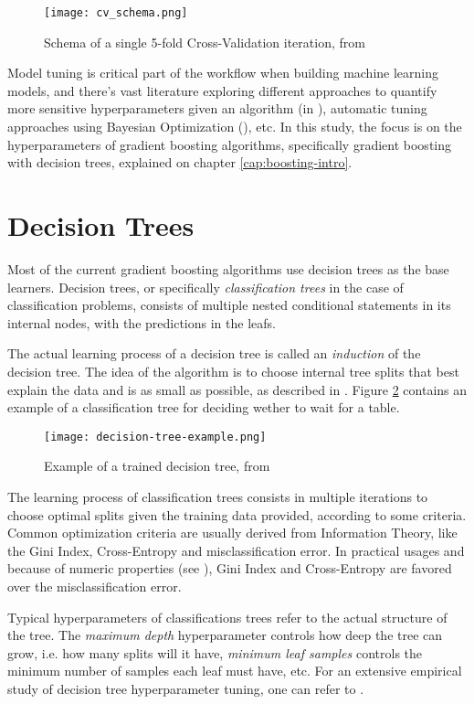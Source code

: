 \begin{figure}[!h]
    \centering
    \texttt{[image: cv\_schema.png]} 
    \caption{Schema of a single 5-fold Cross-Validation iteration, from \cite{hastie2009elements}}
    \label{fig:cvschema}
\end{figure}

Model tuning is critical part of the workflow when building machine learning models, and there's vast literature exploring different approaches to quantify more sensitive hyperparameters given an algorithm (in \cite{probst2018tunability}), automatic tuning approaches using Bayesian Optimization (\cite{bergstra2013hyperopt}), etc. In this study, the focus is on the hyperparameters of gradient boosting algorithms, specifically gradient boosting with decision trees, explained on chapter \ref{cap:boosting-intro}.

\section{Decision Trees}

Most of the current gradient boosting algorithms use decision trees as the base learners. Decision trees, or specifically \textit{classification trees} in the case of classification problems, consists of multiple nested conditional statements in its internal nodes, with the predictions in the leafs.

The actual learning process of a decision tree is called an \textit{induction} of the decision tree. The idea of the algorithm is to choose internal tree splits that best explain the data and is as small as possible, as described in \cite{aima:2010}. Figure \ref{fig:decision-tree-example} contains an example of a classification tree for deciding wether to wait for a table.

\begin{figure}[!h]
    \centering
    \texttt{[image: decision-tree-example.png]} 
    \caption{Example of a trained decision tree, from \cite{aima:2010}}
    \label{fig:decision-tree-example}
\end{figure}

The learning process of classification trees consists in multiple iterations to choose optimal splits given the training data provided, according to some criteria. Common optimization criteria are usually derived from Information Theory, like the Gini Index, Cross-Entropy and misclassification error. In practical usages and because of numeric properties (see \cite{hastie2009elements}), Gini Index and Cross-Entropy are favored over the misclassification error.

Typical hyperparameters of classifications trees refer to the actual structure of the tree. The \textit{maximum depth} hyperparameter controls how deep the tree can grow, i.e. how many splits will it have, \textit{minimum leaf samples} controls the minimum number of samples each leaf must have, etc. For an extensive empirical study of decision tree hyperparameter tuning, one can refer to \cite{mantovani2018empirical}.

